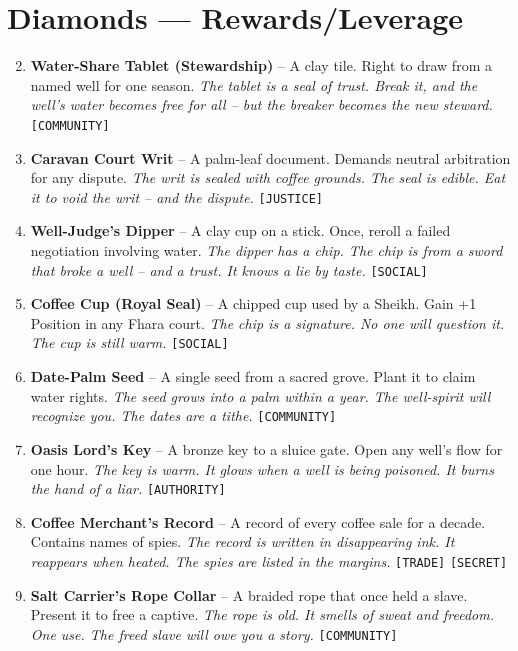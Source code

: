 \section*{Diamonds --- Rewards/Leverage}
\label{sec:fhara-rewards}
\begin{enumerate}
\setcounter{enumi}{1}
\item \textbf{Water-Share Tablet (Stewardship)} -- A clay tile. Right to draw from a named well for one season.
  \hfill \textit{The tablet is a seal of trust. Break it, and the well's water becomes free for all -- but the breaker becomes the new steward.} \texttt{[COMMUNITY]}
\item \textbf{Caravan Court Writ} -- A palm-leaf document. Demands neutral arbitration for any dispute.
  \hfill \textit{The writ is sealed with coffee grounds. The seal is edible. Eat it to void the writ -- and the dispute.} \texttt{[JUSTICE]}
\item \textbf{Well-Judge's Dipper} -- A clay cup on a stick. Once, reroll a failed negotiation involving water.
  \hfill \textit{The dipper has a chip. The chip is from a sword that broke a well -- and a trust. It knows a lie by taste.} \texttt{[SOCIAL]}
\item \textbf{Coffee Cup (Royal Seal)} -- A chipped cup used by a Sheikh. Gain +1 Position in any Fhara court.
  \hfill \textit{The chip is a signature. No one will question it. The cup is still warm.} \texttt{[SOCIAL]}
\item \textbf{Date-Palm Seed} -- A single seed from a sacred grove. Plant it to claim water rights.
  \hfill \textit{The seed grows into a palm within a year. The well-spirit will recognize you. The dates are a tithe.} \texttt{[COMMUNITY]}
\item \textbf{Oasis Lord's Key} -- A bronze key to a sluice gate. Open any well's flow for one hour.
  \hfill \textit{The key is warm. It glows when a well is being poisoned. It burns the hand of a liar.} \texttt{[AUTHORITY]}
\item \textbf{Coffee Merchant's Record} -- A record of every coffee sale for a decade. Contains names of spies.
  \hfill \textit{The record is written in disappearing ink. It reappears when heated. The spies are listed in the margins.} \texttt{[TRADE]} \texttt{[SECRET]}
\item \textbf{Salt Carrier's Rope Collar} -- A braided rope that once held a slave. Present it to free a captive.
  \hfill \textit{The rope is old. It smells of sweat and freedom. One use. The freed slave will owe you a story.} \texttt{[COMMUNITY]}

\end{enumerate}
